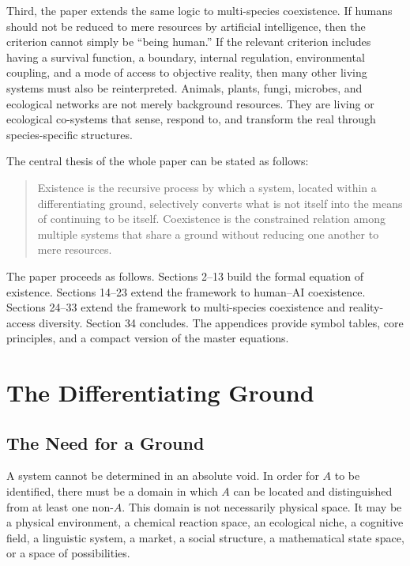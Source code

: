 \documentclass[11pt,a4paper]{article}
\begin{document}
Third, the paper extends the same logic to multi-species coexistence. If humans should not be reduced to mere resources by artificial intelligence, then the criterion cannot simply be ``being human.'' If the relevant criterion includes having a survival function, a boundary, internal regulation, environmental coupling, and a mode of access to objective reality, then many other living systems must also be reinterpreted. Animals, plants, fungi, microbes, and ecological networks are not merely background resources. They are living or ecological co-systems that sense, respond to, and transform the real through species-specific structures.

The central thesis of the whole paper can be stated as follows:

\begin{quote}
Existence is the recursive process by which a system, located within a differentiating ground, selectively converts what is not itself into the means of continuing to be itself. Coexistence is the constrained relation among multiple systems that share a ground without reducing one another to mere resources.
\end{quote}

The paper proceeds as follows. Sections 2--13 build the formal equation of existence. Sections 14--23 extend the framework to human--AI coexistence. Sections 24--33 extend the framework to multi-species coexistence and reality-access diversity. Section 34 concludes. The appendices provide symbol tables, core principles, and a compact version of the master equations.

\section{The Differentiating Ground}

\subsection{The Need for a Ground}

A system cannot be determined in an absolute void. In order for $A$ to be identified, there must be a domain in which $A$ can be located and distinguished from at least one non-$A$. This domain is not necessarily physical space. It may be a physical environment, a chemical reaction space, an ecological niche, a cognitive field, a linguistic system, a market, a social structure, a mathematical state space, or a space of possibilities.
\end{document}
